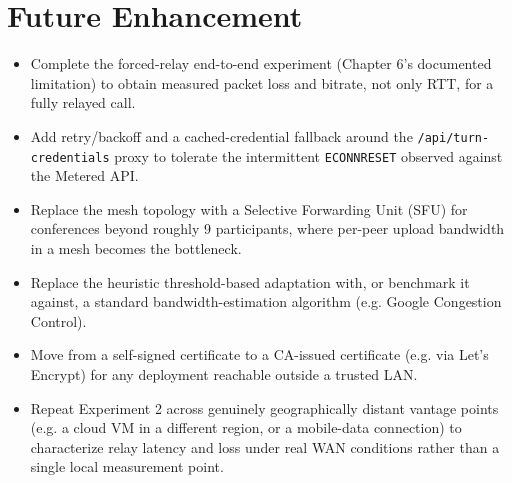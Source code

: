 \documentclass[12pt,a4paper]{report}
\begin{document}
\chapter{Future Enhancement}
\begin{itemize}[nosep]
  \item Complete the forced-relay end-to-end experiment (Chapter 6's documented limitation)
  to obtain measured packet loss and bitrate, not only RTT, for a fully relayed call.
  \item Add retry/backoff and a cached-credential fallback around the
  \texttt{/api/turn-credentials} proxy to tolerate the intermittent \texttt{ECONNRESET}
  observed against the Metered API.
  \item Replace the mesh topology with a Selective Forwarding Unit (SFU) for conferences
  beyond roughly 9 participants, where per-peer upload bandwidth in a mesh becomes the
  bottleneck.
  \item Replace the heuristic threshold-based adaptation with, or benchmark it against, a
  standard bandwidth-estimation algorithm (e.g. Google Congestion Control).
  \item Move from a self-signed certificate to a CA-issued certificate (e.g. via Let's
  Encrypt) for any deployment reachable outside a trusted LAN.
  \item Repeat Experiment 2 across genuinely geographically distant vantage points (e.g. a
  cloud VM in a different region, or a mobile-data connection) to characterize relay
  latency and loss under real WAN conditions rather than a single local measurement point.
\end{itemize}
\end{document}
